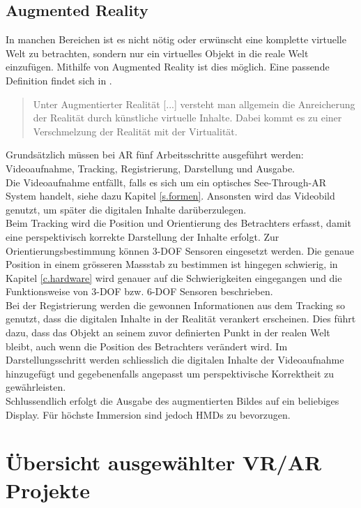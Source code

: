 \section{Augmented Reality}
In manchen Bereichen ist es nicht nötig oder erwünscht eine komplette virtuelle Welt zu betrachten, sondern nur ein virtuelles Objekt in die reale Welt einzufügen. Mithilfe von Augmented Reality ist dies möglich. Eine passende Definition findet sich in \cite{doerner13}.
\begin{quote}
Unter Augmentierter Realität [...] versteht man allgemein die Anreicherung der Realität durch künstliche virtuelle Inhalte. Dabei kommt es zu einer Verschmelzung der Realität mit der Virtualität.
\end{quote}
Grundsätzlich müssen bei AR fünf Arbeitsschritte ausgeführt werden: Videoaufnahme, Tracking, Registrierung, Darstellung und Ausgabe.\\[6pt]  
Die Videoaufnahme entfällt, falls es sich um ein optisches See-Through-AR System handelt, siehe dazu Kapitel \ref{s.formen}. Ansonsten wird das Videobild genutzt, um später die digitalen Inhalte darüberzulegen.\\[6pt]   
Beim Tracking wird die Position und Orientierung des Betrachters erfasst, damit eine perspektivisch korrekte Darstellung der Inhalte erfolgt. Zur Orientierungsbestimmung können 3-DOF Sensoren eingesetzt werden. Die genaue Position in einem grösseren Massstab zu bestimmen ist hingegen schwierig, in Kapitel \ref{c.hardware} wird genauer auf die Schwierigkeiten eingegangen und die Funktionsweise von 3-DOF bzw. 6-DOF Sensoren beschrieben.\\[6pt]  
 Bei der Registrierung werden die gewonnen Informationen aus dem Tracking so genutzt, dass die digitalen Inhalte in der Realität verankert erscheinen. Dies führt dazu, dass das Objekt an seinem zuvor definierten Punkt in der realen Welt bleibt, auch wenn die Position des Betrachters verändert wird. 
 Im Darstellungsschritt werden schliesslich die digitalen Inhalte der Videoaufnahme hinzugefügt und gegebenenfalls angepasst um perspektivische Korrektheit zu gewährleisten.\\[6pt]  
 Schlussendlich erfolgt die Ausgabe des augmentierten Bildes auf ein beliebiges Display. Für höchste Immersion sind jedoch HMDs zu bevorzugen.\cite[S.~241~ff.]{doerner13}

\chapter{Übersicht ausgewählter VR/AR Projekte}\label{c.projects}
\vspace{-20pt}
